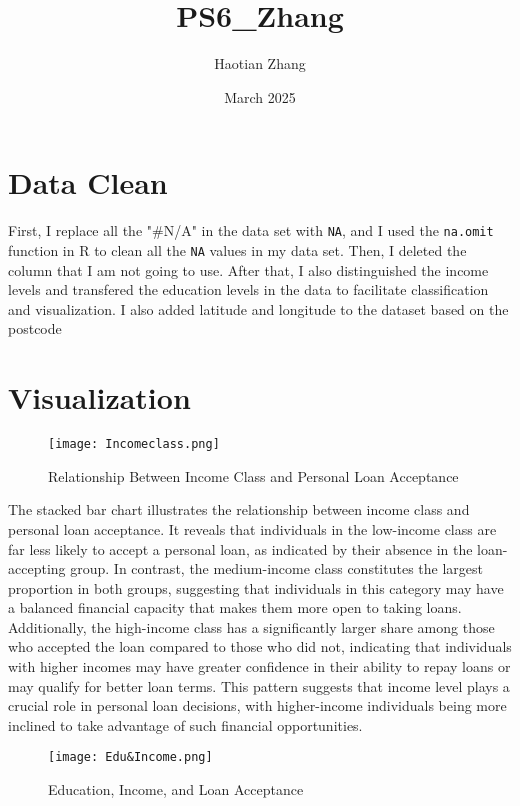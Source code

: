 \documentclass{article}
\title{PS6_Zhang}
\author{Haotian Zhang}
\date{March 2025}
\begin{document}
\maketitle

\section{Data Clean}

First, I replace all the "\#N/A" in the data set with \texttt{NA}, and I used the \texttt{na.omit} function in R to clean all the \texttt{NA} values in my data set. Then, I deleted the column that I am not going to use. After that, I also distinguished the income levels and transfered the education levels in the data to facilitate classification and visualization. I also added latitude and longitude to the dataset based on the postcode


\section{Visualization}

\begin{figure}[h]
    \centering
    \texttt{[image: Incomeclass.png]}
    \caption{Relationship Between Income Class and Personal Loan Acceptance }
    \label{fig:enter-label}
\end{figure}
The stacked bar chart illustrates the relationship between income class and personal loan acceptance. It reveals that individuals in the low-income class are far less likely to accept a personal loan, as indicated by their absence in the loan-accepting group. In contrast, the medium-income class constitutes the largest proportion in both groups, suggesting that individuals in this category may have a balanced financial capacity that makes them more open to taking loans. Additionally, the high-income class has a significantly larger share among those who accepted the loan compared to those who did not, indicating that individuals with higher incomes may have greater confidence in their ability to repay loans or may qualify for better loan terms. This pattern suggests that income level plays a crucial role in personal loan decisions, with higher-income individuals being more inclined to take advantage of such financial opportunities.

\begin{figure}[h]
    \centering
    \texttt{[image: Edu\&Income.png]}
    \caption{Education, Income, and Loan Acceptance}
    \label{fig:enter-label}
\end{figure}
\end{document}
